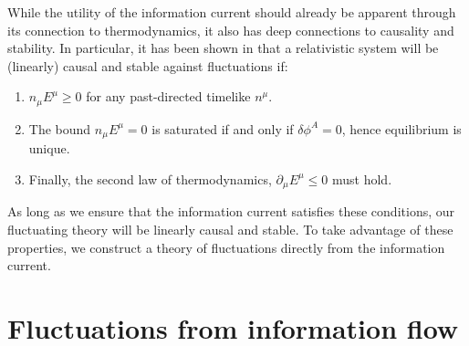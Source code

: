 \documentclass{webofc}
\begin{document}
While the utility of the information current should already be apparent through its connection to thermodynamics, it also has deep connections to causality and stability. In particular, it has been shown in \cite{Gavassino:2021kjm} that a relativistic system will be (linearly) causal and stable against fluctuations if:
\begin{enumerate}
    \item $n_{\mu} E^{\mu} \geq 0$ for any past-directed timelike $n^{\mu}$.  
    \item The bound $n_{\mu} E^{\mu} = 0$ is saturated if and only if $\delta \phi^A = 0$, hence equilibrium is unique. 
    \item Finally, the second law of thermodynamics, $\partial_{\mu} E^{\mu} \leq 0$ must hold. 
\end{enumerate}
As long as we ensure that the information current satisfies these conditions, our fluctuating theory will be linearly causal and stable. To take advantage of these properties, we construct a theory of fluctuations directly from the information current.

\section{Fluctuations from information flow}
\end{document}
